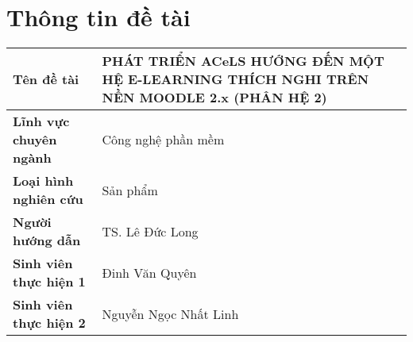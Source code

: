 \section*{Thông tin đề tài}
\begin{longtable}{|p{4cm}|p{10cm}|}
\hline
\textbf{Tên đề tài} & PHÁT TRIỂN ACeLS HƯỚNG ĐẾN MỘT HỆ E-LEARNING THÍCH NGHI TRÊN NỀN MOODLE 2.x (PHÂN HỆ 2) \\ \hline
\textbf{Lĩnh vực chuyên ngành} & Công nghệ phần mềm \\ \hline
\textbf{Loại hình nghiên cứu} & Sản phẩm \\ \hline
\textbf{Người hướng dẫn} & TS. Lê Đức Long \\ \hline
\textbf{Sinh viên thực hiện 1} & Đinh Văn Quyên \\ \hline
\textbf{Sinh viên thực hiện 2} & Nguyễn Ngọc Nhất Linh \\ \hline
\end{longtable}